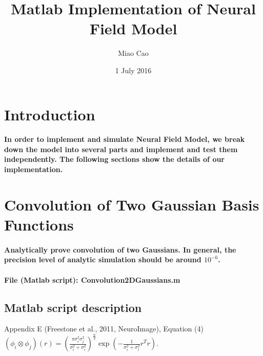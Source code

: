 \documentclass[a4paper, 12pt, english]{article}
\title{Matlab Implementation of Neural Field Model}
\author{Miao Cao}
\date{1 July 2016}
\begin{document}
\begin{titlepage}\centering
\vspace*{\fill}
\maketitle
\vspace*{\fill}
\end{titlepage}

\tableofcontents

\newpage




\section{Introduction}
\paragraph{In order to implement and simulate Neural Field Model, we break down
the model into several parts and implement and test them independently. The
following sections show the details of our implementation.}

\newpage





\section{Convolution of Two Gaussian Basis Functions}

\paragraph{Analytically prove convolution of two Gaussians. In general, the
precision level of analytic simulation should be around $10^{-6}$.}

\paragraph{File (Matlab script): Convolution2DGaussians.m}

\subsection*{Matlab script description}

Appendix E (Freestone et al., 2011, NeuroImage), Equation (4) $\left(\phi_{i}\otimes\phi_{j}\right)(r)=(\frac{\pi\sigma_{i}^{2}\sigma_{j}^{2}}{\sigma_{i}^{2}+\sigma_{i}^{2}})^{\frac{n}{2}}\exp(-\frac{1}{\sigma_{i}^{2}+\sigma_{i}^{2}}r^{T}r)$.
\end{document}
